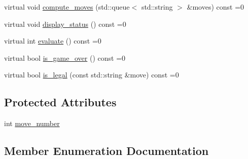 \begin{DoxyCompactItemize}
\item 
virtual void \hyperlink{classmain__savitch__14_1_1game_a2c0c049f5861026d0f639b5837889b7a}{compute\+\_\+moves} (std\+::queue$<$ std\+::string $>$ \&moves) const =0
\item 
virtual void \hyperlink{classmain__savitch__14_1_1game_ac8205178922c49bab2865187e834b726}{display\+\_\+status} () const =0
\item 
virtual int \hyperlink{classmain__savitch__14_1_1game_a9b9c8c5e9aa57c9a430f20b87cb047aa}{evaluate} () const =0
\item 
virtual bool \hyperlink{classmain__savitch__14_1_1game_a49eed20648918b03fd3e2cf78987b3d1}{is\+\_\+game\+\_\+over} () const =0
\item 
virtual bool \hyperlink{classmain__savitch__14_1_1game_ad38351422ca1ee3ae58440c1c6b36b30}{is\+\_\+legal} (const std\+::string \&move) const =0
\end{DoxyCompactItemize}
\subsection*{Protected Attributes}
\begin{DoxyCompactItemize}
\item 
int \hyperlink{classmain__savitch__14_1_1game_ac4c296f4370d8e5bb5ea74b638fb827d}{move\+\_\+number}
\end{DoxyCompactItemize}


\subsection{Member Enumeration Documentation}
